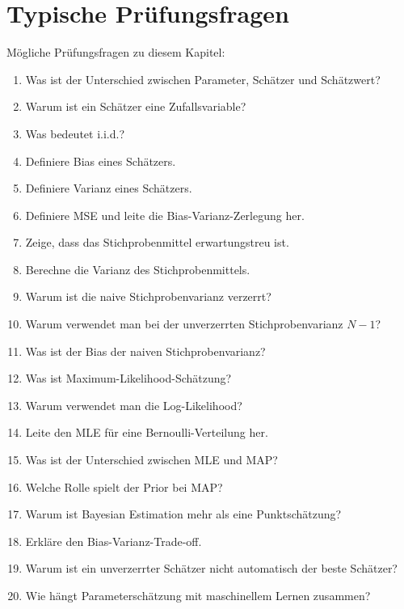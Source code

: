 \section{Typische Prüfungsfragen}

\begin{examtipbox}
Mögliche Prüfungsfragen zu diesem Kapitel:

\begin{enumerate}
    \item Was ist der Unterschied zwischen Parameter, Schätzer und Schätzwert?
    \item Warum ist ein Schätzer eine Zufallsvariable?
    \item Was bedeutet i.i.d.?
    \item Definiere Bias eines Schätzers.
    \item Definiere Varianz eines Schätzers.
    \item Definiere MSE und leite die Bias-Varianz-Zerlegung her.
    \item Zeige, dass das Stichprobenmittel erwartungstreu ist.
    \item Berechne die Varianz des Stichprobenmittels.
    \item Warum ist die naive Stichprobenvarianz verzerrt?
    \item Warum verwendet man bei der unverzerrten Stichprobenvarianz \(N-1\)?
    \item Was ist der Bias der naiven Stichprobenvarianz?
    \item Was ist Maximum-Likelihood-Schätzung?
    \item Warum verwendet man die Log-Likelihood?
    \item Leite den MLE für eine Bernoulli-Verteilung her.
    \item Was ist der Unterschied zwischen MLE und MAP?
    \item Welche Rolle spielt der Prior bei MAP?
    \item Warum ist Bayesian Estimation mehr als eine Punktschätzung?
    \item Erkläre den Bias-Varianz-Trade-off.
    \item Warum ist ein unverzerrter Schätzer nicht automatisch der beste Schätzer?
    \item Wie hängt Parameterschätzung mit maschinellem Lernen zusammen?
\end{enumerate}
\end{examtipbox}